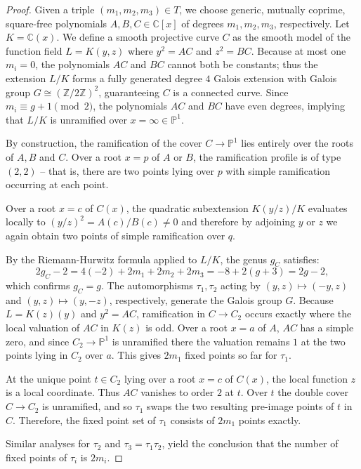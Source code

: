 \documentclass[10pt,a4paper]{amsart}
\newcommand{\C}{\mathbb{C}}
\renewcommand{\P}{\mathbb{P}}
\newcommand{\Z}{\mathbb{Z}}
\begin{document}
\begin{proof}
  Given a triple $(m_1,m_2,m_3) \in T$, we choose generic, mutually coprime,
  square-free polynomials $A,B,C \in \C[x]$ of degrees $m_1, m_2, m_3$,
  respectively. Let $K = \C(x)$.  We define a smooth projective curve $C$ as the
  smooth model of the function field $L = K(y,z)$ where $y^{2} = AC$ and $z^{2}
  = BC$.  Because at most one $m_i = 0$, the polynomials $AC$ and $BC$ cannot
  both be constants; thus the extension $L/K$ forms a fully generated degree $4$
  Galois extension with Galois group $G \cong (\Z/2\Z)^{2}$, guaranteeing $C$ is
  a connected curve.  Since $m_i \equiv g+1 \pmod 2$, the polynomials $AC$ and
  $BC$ have even degrees, implying that $L/K$ is unramified over $x = \infty \in
  \P^{1}$. 

  By construction, the ramification of the cover $C \to \P^{1}$ lies entirely
  over the roots of $A,B$ and $C$.  Over a root $x=p$ of $A$ or $B$, the ramification
  profile is of type $(2,2)$ -- that is, there are two points lying over $p$
  with simple ramification occurring at each point. 

  Over a root $x=c$ of $C(x)$, the quadratic subextension $K(y/z)/K$ evaluates locally to
  $(y/z)^{2} = A(c)/B(c) \neq 0$ and therefore by adjoining $y$ or $z$ we again
  obtain two points of simple ramification over $q$.  

  By the Riemann-Hurwitz formula applied to $L/K$, the genus $g_C$ satisfies: 
  \[2g_{C}-2 = 4(-2) + 2m_1 + 2m_2 + 2 m_3 = -8 + 2(g+3) = 2g-2,\] which
  confirms $g_{C}=g$. The automorphisms $\tau_1, \tau_2$ acting by $(y,z) \mapsto (-y,z)$
 and $(y,z) \mapsto (y,-z)$, respectively, generate the Galois group $G$. Because $L
 = K(z)(y)$ and $y^{2} = AC$, ramification in $C \to C_{2}$ occurs exactly where
 the local valuation of $AC$ in $K(z)$ is odd.  Over a root $x=a$ of $A$, $AC$ has a
 simple zero, and since $C_{2} \to \P^{1}$ is unramified there the valuation
 remains $1$ at the two points lying in $C_{2}$ over $a$.  This gives
 $2m_1$ fixed points so far for $\tau_1$.  

 At the unique point $t \in C_{2}$ lying over a root $x = c$ of $C(x)$, the local function $z$ is a local coordinate. 
 Thus $AC$ vanishes to order $2$ at $t$. Over $t$ the double cover $C \to C_2$ is unramified, and so $\tau_{1}$ swaps the two 
 resulting pre-image points of $t$ in $C$.   Therefore, the fixed point set of $\tau_1$ consists of $2m_1$ points exactly. 

 Similar analyses for $\tau_2$ and $\tau_3 = \tau_1 \tau_{2}$, yield the conclusion that the number of fixed points
 of $\tau_i$ is $2m_i$.



\end{proof}
\end{document}
